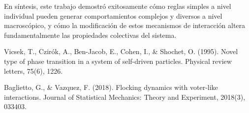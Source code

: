 \documentclass{article}
\begin{document}
En síntesis, este trabajo demostró exitosamente cómo reglas simples a nivel individual pueden generar comportamientos complejos y diversos a nivel macroscópico, y cómo la modificación de estos mecanismos de interacción altera fundamentalmente las propiedades colectivas del sistema.


\begin{thebibliography}{9}
Vicsek, T., Czirók, A., Ben-Jacob, E., Cohen, I., \& Shochet, O. (1995). Novel type of phase transition in a system of self-driven particles. Physical review letters, 75(6), 1226.

Baglietto, G., \& Vazquez, F. (2018). Flocking dynamics with voter-like interactions. Journal of Statistical Mechanics: Theory and Experiment, 2018(3), 033403.
\end{thebibliography}
\end{document}
